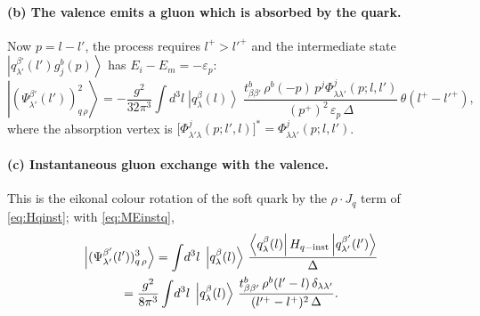 \documentclass[11pt,a4paper]{article}
\numberwithin{equation}{section}
\newcommand{\ibar}[2]{\draw[line width=1.1pt] (#1-0.13,#2) -- (#1+0.13,#2);}
\newcommand{\eps}{\varepsilon}
\newcommand{\ket}[1]{\left|#1\right\rangle}
\newcommand{\bra}[1]{\left\langle#1\right|}
\newcommand{\Ph}{\Phi}
\newcommand{\qk}[3]{q^{#1}_{#2}(#3)}
\newcommand{\gl}[3]{g^{#1}_{#2}(#3)}
\begin{document}
\paragraph{(b) The valence emits a gluon which is absorbed by the quark.}
\begin{center}
\end{center}
Now $p=l-l'$, the process requires $l^{+}>l'^{+}$ and the intermediate state
$\ket{\qk{\beta'}{\lambda'}{l'}\gl{b}{j}{p}}$ has $E_{i}-E_{m}=-\eps_{p}$:
\begin{equation}
\ket{(\Psi^{\beta'}_{\lambda'}(l'))^{2}_{q\,\rho}}=-\frac{g^{2}}{32\pi^{3}}\int\!d^{3}l\;\ket{\qk{\beta}{\lambda}{l}}\;
\frac{t^{b}_{\beta\beta'}\,\rho^{b}(-p)\,p^{j}\Ph^{j}_{\lambda\lambda'}(p;l,l')}{(p^{+})^{2}\,\eps_{p}\,\Delta}\,
\theta(l^{+}-l'^{+}) ,
\label{eq:P1b}
\end{equation}
where the absorption vertex is $\big[\Ph^{j}_{\lambda'\lambda}(p;l',l)\big]^{*}=\Ph^{j}_{\lambda\lambda'}(p;l,l')$.

\paragraph{(c) Instantaneous gluon exchange with the valence.}
\begin{center}
\end{center}
This is the eikonal colour rotation of the soft quark by the $\rho\cdot J_{q}$ term of
\eqref{eq:Hqinst}; with \eqref{eq:MEinstq},
\begin{multline}
\ket{(\Psi^{\beta'}_{\lambda'}(l'))^{3}_{q\,\rho}}=\int\!d^{3}l\;\ket{\qk{\beta}{\lambda}{l}}\,
\frac{\bra{\qk{\beta}{\lambda}{l}}H_{q-{\rm inst}}\ket{\qk{\beta'}{\lambda'}{l'}}}{\Delta}\\
=\frac{g^{2}}{8\pi^{3}}\int\!d^{3}l\;\ket{\qk{\beta}{\lambda}{l}}\,
\frac{t^{b}_{\beta\beta'}\,\rho^{b}(l'-l)\,\delta_{\lambda\lambda'}}{(l'^{+}-l^{+})^{2}\,\Delta} .
\label{eq:P1c}
\end{multline}
\end{document}

